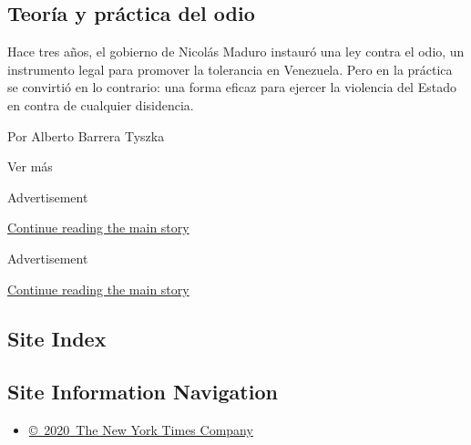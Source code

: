 \begin{enumerate}
  \hypertarget{teoruxeda-y-pruxe1ctica-del-odio}{%
  \subsection{Teoría y práctica del
  odio}\label{teoruxeda-y-pruxe1ctica-del-odio}}

  Hace tres años, el gobierno de Nicolás Maduro instauró una ley contra
  el odio, un instrumento legal para promover la tolerancia en
  Venezuela. Pero en la práctica se convirtió en lo contrario: una forma
  eficaz para ejercer la violencia del Estado en contra de cualquier
  disidencia.

  Por Alberto Barrera Tyszka
\end{enumerate}

Ver más

Advertisement

\protect\hyperlink{after-mid2}{Continue reading the main story}

Advertisement

\protect\hyperlink{after-mktg}{Continue reading the main story}

\hypertarget{site-index}{%
\subsection{Site Index}\label{site-index}}

\hypertarget{site-information-navigation}{%
\subsection{Site Information
Navigation}\label{site-information-navigation}}

\begin{itemize}
\tightlist
\item
  \href{https://help.nytimes3xbfgragh.onion/hc/en-us/articles/115014792127-Copyright-notice}{©~2020~The
  New York Times Company}
\end{itemize}


